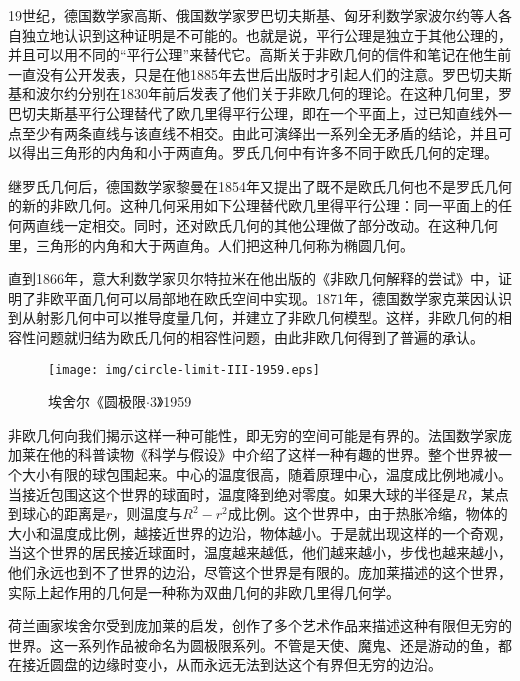 \documentclass{article}
\begin{document}
19世纪，德国数学家高斯、俄国数学家罗巴切夫斯基、匈牙利数学家波尔约等人各自独立地认识到这种证明是不可能的。也就是说，平行公理是独立于其他公理的，并且可以用不同的“平行公理”来替代它。高斯关于非欧几何的信件和笔记在他生前一直没有公开发表，只是在他1885年去世后出版时才引起人们的注意。罗巴切夫斯基和波尔约分别在1830年前后发表了他们关于非欧几何的理论。在这种几何里，罗巴切夫斯基平行公理替代了欧几里得平行公理，即在一个平面上，过已知直线外一点至少有两条直线与该直线不相交。由此可演绎出一系列全无矛盾的结论，并且可以得出三角形的内角和小于两直角。罗氏几何中有许多不同于欧氏几何的定理。

继罗氏几何后，德国数学家黎曼在1854年又提出了既不是欧氏几何也不是罗氏几何的新的非欧几何。这种几何采用如下公理替代欧几里得平行公理：同一平面上的任何两直线一定相交。同时，还对欧氏几何的其他公理做了部分改动。在这种几何里，三角形的内角和大于两直角。人们把这种几何称为椭圆几何。

直到1866年，意大利数学家贝尔特拉米在他出版的《非欧几何解释的尝试》中，证明了非欧平面几何可以局部地在欧氏空间中实现。1871年，德国数学家克莱因认识到从射影几何中可以推导度量几何，并建立了非欧几何模型。这样，非欧几何的相容性问题就归结为欧氏几何的相容性问题，由此非欧几何得到了普遍的承认。

\begin{figure}[htbp]
 \centering
 \texttt{[image: img/circle-limit-III-1959.eps]}
 \captionsetup{labelformat=empty}
 \caption{埃舍尔《圆极限$\cdot$3》1959}
 \label{fig:circle-limit-3}
\end{figure}

非欧几何向我们揭示这样一种可能性，即无穷的空间可能是有界的。法国数学家庞加莱在他的科普读物《科学与假设》中介绍了这样一种有趣的世界。整个世界被一个大小有限的球包围起来。中心的温度很高，随着原理中心，温度成比例地减小。当接近包围这这个世界的球面时，温度降到绝对零度。如果大球的半径是$R$，某点到球心的距离是$r$，则温度与$R^2 - r^2$成比例。这个世界中，由于热胀冷缩，物体的大小和温度成比例，越接近世界的边沿，物体越小。于是就出现这样的一个奇观，当这个世界的居民接近球面时，温度越来越低，他们越来越小，步伐也越来越小，他们永远也到不了世界的边沿，尽管这个世界是有限的。庞加莱描述的这个世界，实际上起作用的几何是一种称为双曲几何的非欧几里得几何学。

荷兰画家埃舍尔受到庞加莱的启发，创作了多个艺术作品来描述这种有限但无穷的世界。这一系列作品被命名为圆极限系列。不管是天使、魔鬼、还是游动的鱼，都在接近圆盘的边缘时变小，从而永远无法到达这个有界但无穷的边沿。
\end{document}
